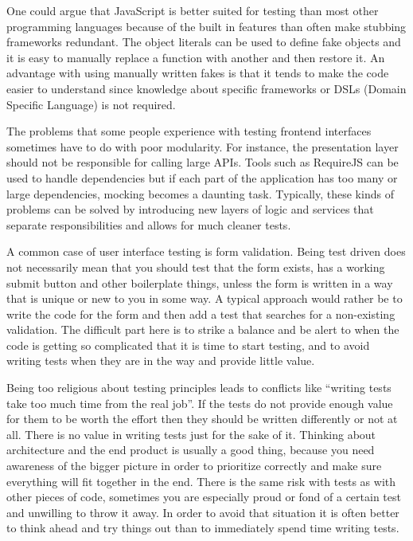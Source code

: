 \documentclass[11pt]{article}
\begin{document}

One could argue that JavaScript is better suited for testing than most other programming languages because of the built in features than often make stubbing frameworks redundant. The object literals can be used to define fake objects and it is easy to manually replace a function with another and then restore it. An advantage with using manually written fakes is that it tends to make the code easier to understand since knowledge about specific frameworks or DSLs (Domain Specific Language) is not required. \cite[questions~20-21]{Edelstam}

The problems that some people experience with testing frontend interfaces sometimes have to do with poor modularity. For instance, the presentation layer should not be responsible for calling large APIs. Tools such as RequireJS can be used to handle dependencies but if each part of the application has too many or large dependencies, mocking becomes a daunting task. Typically, these kinds of problems can be solved by introducing new layers of logic and services that separate responsibilities and allows for much cleaner tests. \cite[question~23]{Edelstam}

A common case of user interface testing is form validation. Being test driven does not necessarily mean that you should test that the form exists, has a working submit button and other boilerplate things, unless the form is written in a way that is unique or new to you in some way. A typical approach would rather be to write the code for the form and then add a test that searches for a non-existing validation. The difficult part here is to strike a balance and be alert to when the code is getting so complicated that it is time to start testing, and to avoid writing tests when they are in the way and provide little value. \cite[questions~24-25]{Edelstam}

Being too religious about testing principles leads to conflicts like ``writing tests take too much time from the real job''. If the tests do not provide enough value for them to be worth the effort then they should be written differently or not at all. There is no value in writing tests just for the sake of it. Thinking about architecture and the end product is usually a good thing, because you need awareness of the bigger picture in order to prioritize correctly and make sure everything will fit together in the end. There is the same risk with tests as with other pieces of code, sometimes you are especially proud or fond of a certain test and unwilling to throw it away. In order to avoid that situation it is often better to think ahead and try things out than to immediately spend time writing tests. \cite[question~27]{Edelstam}
\end{document}
